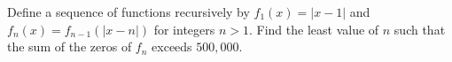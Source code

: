 Define a sequence of functions recursively by $f_1(x) = |x-1|$ and $f_n(x)=f_{n-1}(|x-n|)$ for integers $n > 1$. Find the least value of $n$ such that the sum of the zeros of $f_n$ exceeds $500{,}000$.